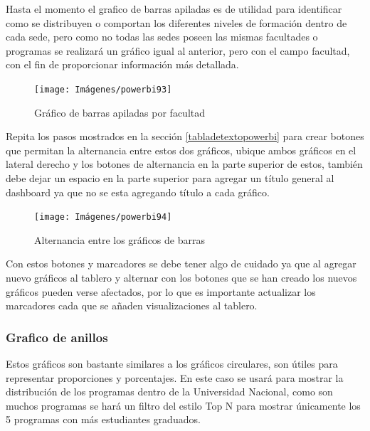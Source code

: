 \documentclass[
]{book}
\begin{document}
Hasta el momento el grafico de barras apiladas es de utilidad para identificar como se distribuyen o comportan los diferentes niveles de formación dentro de cada sede, pero como no todas las sedes poseen las mismas facultades o programas se realizará un gráfico igual al anterior, pero con el campo facultad, con el fin de proporcionar información más detallada.

\begin{figure}

{\centering \texttt{[image: Imágenes/powerbi93]} 

}

\caption{Gráfico de barras apiladas por facultad}\label{fig:barrasapiladasfacultad-fig}
\end{figure}

Repita los pasos mostrados en la sección \ref{tabladetextopowerbi} para crear botones que permitan la alternancia entre estos dos gráficos, ubique ambos gráficos en el lateral derecho y los botones de alternancia en la parte superior de estos, también debe dejar un espacio en la parte superior para agregar un título general al dashboard ya que no se esta agregando título a cada gráfico.

\begin{figure}

{\centering \texttt{[image: Imágenes/powerbi94]} 

}

\caption{Alternancia entre los gráficos de barras}\label{fig:alternanciaentrebarrasapiladas-fig}
\end{figure}

Con estos botones y marcadores se debe tener algo de cuidado ya que al agregar nuevo gráficos al tablero y alternar con los botones que se han creado los nuevos gráficos pueden verse afectados, por lo que es importante actualizar los marcadores cada que se añaden visualizaciones al tablero.

\hypertarget{gruxe1ficoanillos}{%
\subsubsection{Grafico de anillos}\label{gruxe1ficoanillos}}

Estos gráficos son bastante similares a los gráficos circulares, son útiles para representar proporciones y porcentajes. En este caso se usará para mostrar la distribución de los programas dentro de la Universidad Nacional, como son muchos programas se hará un filtro del estilo Top N para mostrar únicamente los 5 programas con más estudiantes graduados.
\end{document}
